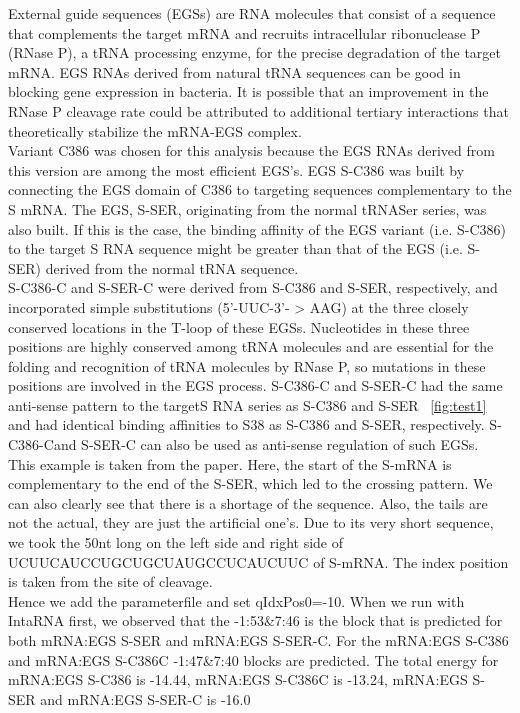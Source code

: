 \documentclass[twoside,a4paper]{report}
\begin{document}
	  External guide sequences (EGSs) are RNA molecules that consist of a sequence that complements the target mRNA and recruits intracellular ribonuclease P (RNase P), a tRNA processing enzyme, for the precise degradation of the target mRNA. EGS  RNAs  derived  from  natural  tRNA sequences can be good in blocking gene expression in  bacteria. It is possible that an improvement in the RNase P cleavage rate could be attributed to additional tertiary interactions that theoretically stabilize the mRNA-EGS complex.\\
	 
	  Variant C386 was chosen for this analysis because the EGS RNAs derived from this version are among the most efficient EGS's. EGS S-C386 was built by connecting the EGS domain of C386 to targeting sequences complementary to the S mRNA. The EGS, S-SER, originating from the normal tRNASer series, was also built. If this is the case, the binding affinity of the EGS variant (i.e. S-C386) to the target S RNA sequence might be greater than that of the EGS (i.e. S-SER) derived from the normal tRNA sequence. \\
	 
	 S-C386-C and S-SER-C were derived from S-C386 and S-SER, respectively, and incorporated simple substitutions (5'-UUC-3'- > AAG) at the three closely conserved locations in the T-loop of these EGSs. Nucleotides in these three positions are highly conserved among tRNA molecules and are essential for the folding and recognition of tRNA molecules by RNase P, so mutations in these positions are involved in the EGS process. S-C386-C and S-SER-C had the same anti-sense pattern to the targetS RNA series as S-C386 and S-SER ~\ref{fig:test1}  and had identical binding affinities to S38 as S-C386 and S-SER, respectively. S-C386-Cand S-SER-C can also be used as anti-sense regulation of such EGSs.\\
	 
	 This example is taken from the paper{\citep{zhang2013engineered}}. Here, the start of the S-mRNA is complementary to the end of the S-SER, which led to the crossing pattern. We can also clearly see that there is a shortage of the sequence. Also, the tails are not the actual, they are just the artificial one's. Due to its very short sequence, we took the 50nt long on the left side and right side of UCUUCAUCCUGCUGCUAUGCCUCAUCUUC of S-mRNA. The index position is taken from the site of cleavage.\\
	 
	 Hence we add the parameterfile and set qIdxPos0=-10. When we run with IntaRNA first, we observed that the -1:53\&7:46 is the block that is predicted for both mRNA:EGS S-SER and mRNA:EGS S-SER-C. For the mRNA:EGS S-C386 and mRNA:EGS S-C386C -1:47\&7:40 blocks are predicted. The total energy for mRNA:EGS S-C386 is -14.44, mRNA:EGS S-C386C is -13.24, mRNA:EGS S-SER and mRNA:EGS S-SER-C is -16.0  \\
	 
\end{document}

